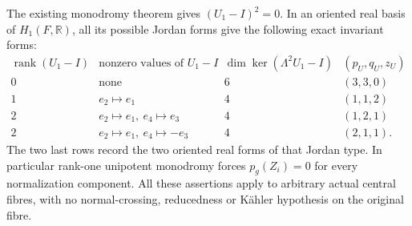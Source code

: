 \begin{proposition}
The existing monodromy theorem gives
$(U_1-I)^2=0$. In an oriented real basis of
$H_1(F,\mathbb R)$, all its possible Jordan forms
give the following exact invariant forms:
\[
\begin{array}{c|c|c|c}
\operatorname{rank}(U_1-I)&\text{nonzero values of }U_1-I
 &\dim\ker(\Lambda^2U_1-I)&(p_U,q_U,z_U)\\ \hline
0&\text{none}&6&(3,3,0)\\
1&e_2\mapsto e_1&4&(1,1,2)\\
2&e_2\mapsto e_1,\ e_4\mapsto e_3&4&(1,2,1)\\
2&e_2\mapsto e_1,\ e_4\mapsto-e_3&4&(2,1,1).
\end{array}                                                   \tag{C.CL.6}\label{cdp:eq:C.CL.6}
\]
The two last rows record the two oriented real
forms of that Jordan type. In particular rank-one
unipotent monodromy forces $p_g(Z_i)=0$ for every
normalization component. All these assertions
apply to arbitrary actual central fibres, with
no normal-crossing, reducedness or K\"ahler
hypothesis on the original fibre.
\end{proposition}

